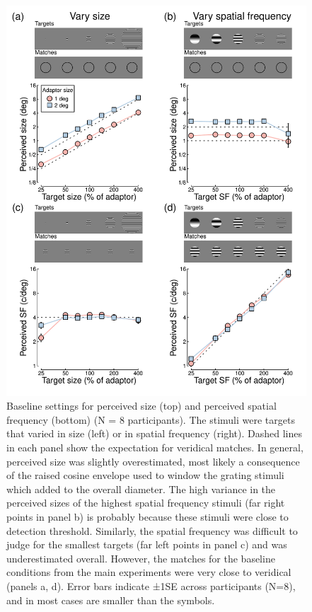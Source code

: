 \documentclass[
]{article}
\begin{document}
\begin{figure}

{\centering \includegraphics[width=0.8\linewidth]{Figures/FigureS1} 

}

\caption{Baseline settings for perceived size (top) and perceived spatial frequency (bottom) (N = 8 participants). The stimuli were targets that varied in size (left) or in spatial frequency (right). Dashed lines in each panel show the expectation for veridical matches. In general, perceived size was slightly overestimated, most likely a consequence of the raised cosine envelope used to window the grating stimuli which added to the overall diameter. The high variance in the perceived sizes of the highest spatial frequency stimuli (far right points in panel b) is probably because these stimuli were close to detection threshold. Similarly, the spatial frequency was difficult to judge for the smallest targets (far left points in panel c) and was underestimated overall. However, the matches for the baseline conditions from the main experiments were very close to veridical (panels a, d). Error bars indicate ±1SE across participants (N=8), and in most cases are smaller than the symbols.}\label{fig:figureS1}
\end{figure}
\end{document}
